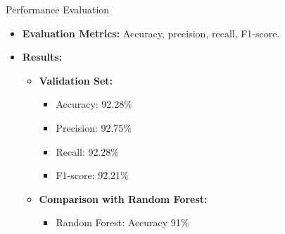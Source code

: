\documentclass{beamer}
\begin{document}
\begin{frame}{Performance Evaluation}
  \begin{itemize}
    \item \textbf{Evaluation Metrics:} Accuracy, precision, recall, F1-score.
    \item \textbf{Results:}
      \begin{itemize}
        \item \textbf{Validation Set:}
          \begin{itemize}
            \item Accuracy: 92.28\%
            \item Precision: 92.75\%
            \item Recall: 92.28\%
            \item F1-score: 92.21\%
          \end{itemize}
        \item \textbf{Comparison with Random Forest:}
          \begin{itemize}
            \item Random Forest: Accuracy 91\%
          \end{itemize}
      \end{itemize}
  \end{itemize}
\end{frame}
\end{document}
